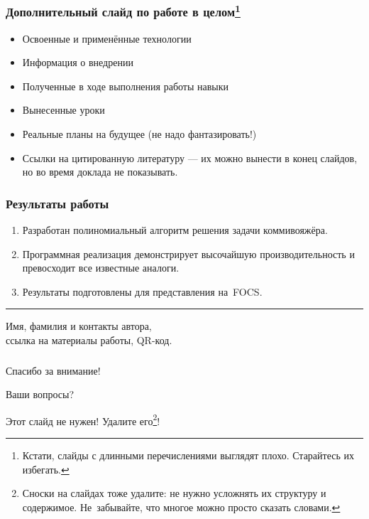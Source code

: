 \documentclass[14pt,aspectratio=169,hyperref={pdftex,unicode},xcolor=dvipsnames]{beamer}
\begin{document}
\begin{frame}
\frametitle{Дополнительный слайд по работе в целом\footnote{Кстати, слайды с длинными перечислениями выглядят плохо. Старайтесь их избегать.}}
\begin{itemize}
\item Освоенные и применённые технологии
\item Информация о внедрении
\item Полученные в ходе выполнения работы навыки
\item Вынесенные уроки
\item Реальные планы на будущее (не надо фантазировать!)
\item Ссылки на цитированную литературу --- их можно вынести в конец слайдов, но во время доклада не показывать.
\end{itemize}

\end{frame}


\begin{frame}
\frametitle{Результаты работы}

\begin{enumerate}
\item Разработан полиномиальный алгоритм решения задачи коммивояжёра.
\item Программная реализация демонстрирует высочайшую производительность и превосходит все известные аналоги.
\item Результаты подготовлены для представления на~FOCS.
\end{enumerate}

\vspace{5mm}\hrule\vspace{5mm}

\begin{center}
Имя, фамилия и контакты автора,\\ссылка на материалы работы, QR-код.
\end{center}

\end{frame}

\begin{frame}
\frametitle{}
\begin{center}
  \Huge Спасибо за внимание!

  Ваши вопросы?

  {\color{red}Этот слайд не нужен! Удалите его\footnote{Сноски на слайдах тоже удалите: не нужно усложнять их структуру и содержимое. Не~забывайте, что многое можно просто сказать словами.}!}
\end{center}
\end{frame}
\end{document}
